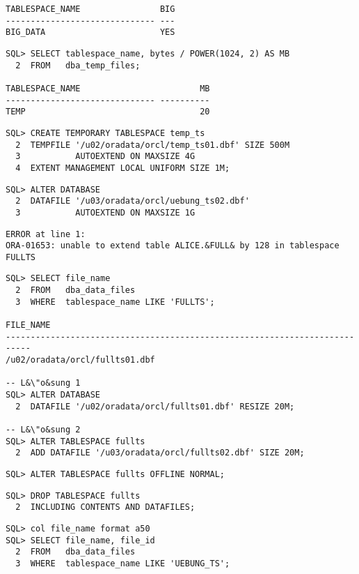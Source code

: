 \begin{enumerate}
\begin{lstlisting}[language=oracle_sql]
TABLESPACE_NAME                BIG
------------------------------ ---
BIG_DATA                       YES

      \end{lstlisting}
    
      \begin{lstlisting}[language=oracle_sql]
SQL> SELECT tablespace_name, bytes / POWER(1024, 2) AS MB
  2  FROM   dba_temp_files;

TABLESPACE_NAME                        MB
------------------------------ ----------
TEMP                                   20
      \end{lstlisting}
    
      \begin{lstlisting}[language=oracle_sql]
SQL> CREATE TEMPORARY TABLESPACE temp_ts
  2  TEMPFILE '/u02/oradata/orcl/temp_ts01.dbf' SIZE 500M
  3           AUTOEXTEND ON MAXSIZE 4G
  4  EXTENT MANAGEMENT LOCAL UNIFORM SIZE 1M;
      \end{lstlisting}
\clearpage
    
      \begin{lstlisting}[language=oracle_sql]
SQL> ALTER DATABASE
  2  DATAFILE '/u03/oradata/orcl/uebung_ts02.dbf'
  3           AUTOEXTEND ON MAXSIZE 1G
      \end{lstlisting}
    
    
		\begin{lstlisting}[language=oracle_sql]
ERROR at line 1:
ORA-01653: unable to extend table ALICE.&FULL& by 128 in tablespace FULLTS
		\end{lstlisting}
		
      \begin{lstlisting}[language=oracle_sql]
SQL> SELECT file_name
  2  FROM   dba_data_files
  3  WHERE  tablespace_name LIKE 'FULLTS';

FILE_NAME
---------------------------------------------------------------------------
/u02/oradata/orcl/fullts01.dbf

-- L&\"o&sung 1
SQL> ALTER DATABASE
  2  DATAFILE '/u02/oradata/orcl/fullts01.dbf' RESIZE 20M;

-- L&\"o&sung 2
SQL> ALTER TABLESPACE fullts
  2  ADD DATAFILE '/u03/oradata/orcl/fullts02.dbf' SIZE 20M;
      \end{lstlisting}
\clearpage
    
      \begin{lstlisting}[language=oracle_sql]
SQL> ALTER TABLESPACE fullts OFFLINE NORMAL;
      \end{lstlisting}
    
      \begin{lstlisting}[language=oracle_sql]
SQL> DROP TABLESPACE fullts
  2  INCLUDING CONTENTS AND DATAFILES;
      \end{lstlisting}
    
      \begin{lstlisting}[language=oracle_sql,alsolanguage=sqlplus]
SQL> col file_name format a50
SQL> SELECT file_name, file_id
  2  FROM   dba_data_files
  3  WHERE  tablespace_name LIKE 'UEBUNG_TS';


\end{lstlisting}
\end{enumerate}
